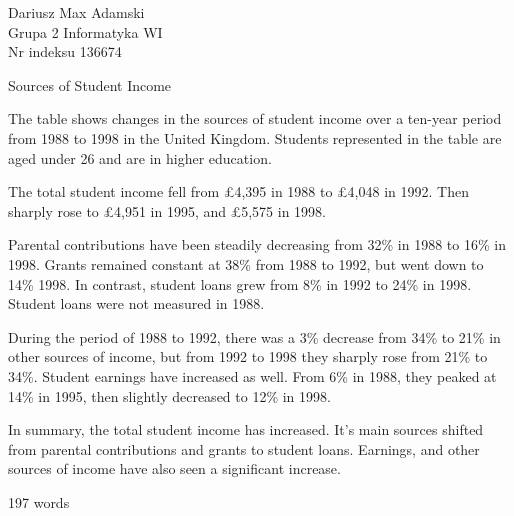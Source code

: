 \documentclass[12pt]{article}
\begin{document}
\begin{flushleft} 
	Dariusz Max Adamski \\
	Grupa 2 Informatyka WI\\
	Nr indeksu 136674
\end{flushleft}

\begin{center} 
	\vspace{0.8cm} \Large
	Sources of Student Income
	\vspace{0.5cm}
\end{center}

The table shows changes in the sources of student income over a ten-year period from 1988 to 1998 in the United Kingdom. Students represented in the table are aged under 26 and are in higher education.

The total student income fell from £4,395 in 1988 to £4,048 in 1992. Then sharply rose to £4,951 in 1995, and £5,575 in 1998.

Parental contributions have been steadily decreasing from 32\% in 1988 to 16\% in 1998. Grants remained constant at 38\% from 1988 to 1992, but went down to 14\% 1998. In contrast, student loans grew from 8\% in 1992 to 24\% in 1998. Student loans were not measured in 1988.

During the period of 1988 to 1992, there was a 3\% decrease from 34\% to 21\% in other sources of income, but from 1992 to 1998 they sharply rose from 21\% to 34\%. Student earnings have increased as well. From 6\% in 1988, they peaked at 14\% in 1995, then slightly decreased to 12\% in 1998.

In summary, the total student income has increased. It's main sources shifted from parental contributions and grants to student loans. Earnings, and other sources of income have also seen a significant increase.

197 words
\end{document}
